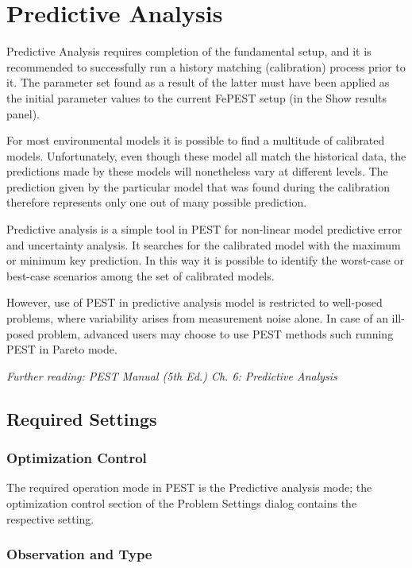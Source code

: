 \chapter{Predictive Analysis}
\label{sec:fepest:predictiveAnalysis}

Predictive Analysis requires completion of the fundamental setup, and it is recommended to successfully run a history matching (calibration) process prior to it. The parameter set found as a result of the latter must have been applied as the initial parameter values to the current FePEST setup (in the Show results panel).

For most environmental models it is possible to find a multitude of calibrated models. Unfortunately, even though these model all match the historical data, the predictions made by these models will nonetheless vary at different levels. The prediction given by the particular model that was found during the calibration therefore represents only one out of many possible prediction.

Predictive analysis is a simple tool in PEST for non-linear model predictive error and uncertainty analysis. It searches for the calibrated model with the maximum or minimum key prediction. In this way it is possible to identify the worst-case or best-case scenarios among the set of calibrated models.

However, use of PEST in predictive analysis model is restricted to well-posed problems, where variability arises from measurement noise alone. In case of an ill-posed problem, advanced users may choose to use PEST methods such running PEST in Pareto mode.

\textit{ Further reading: PEST Manual (5th Ed.)
Ch. 6: Predictive Analysis}

\section{Required Settings}
\subsection{Optimization Control}

The required operation mode in PEST is the Predictive analysis mode; the optimization control section of the Problem Settings dialog contains the respective setting.

\subsection{Observation and Type}

